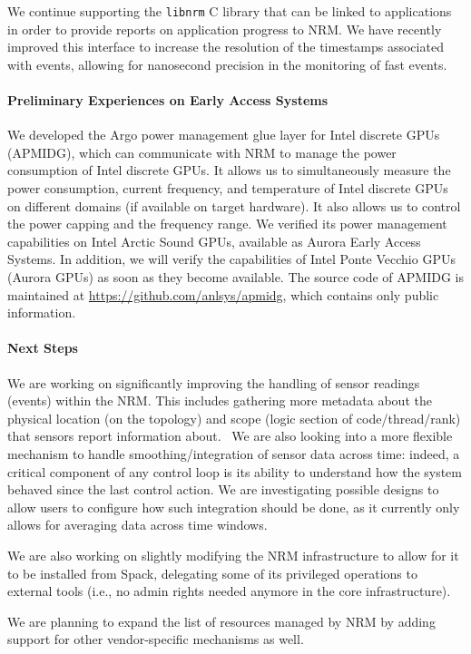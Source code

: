 We continue supporting the \texttt{libnrm} C library that can be linked to
applications in order to provide reports on application progress to NRM. We
have recently improved this interface to increase the resolution of the
timestamps associated with events, allowing for nanosecond precision in the
monitoring of fast events.

\paragraph{Preliminary Experiences on Early Access Systems}

We developed the Argo power management glue layer for Intel discrete GPUs
(APMIDG), which can communicate with NRM to manage the power consumption of
Intel discrete GPUs. It allows us to simultaneously measure the power
consumption, current frequency, and temperature of Intel discrete GPUs on
different domains (if available on target hardware). It also allows us to
control the power capping and the frequency range. We verified its power
management capabilities on Intel Arctic Sound GPUs, available as Aurora
Early Access Systems. In addition, we will verify the capabilities of Intel
Ponte Vecchio GPUs (Aurora GPUs) as soon as they become available. The
source code of APMIDG is maintained at \url{https://github.com/anlsys/apmidg},
which contains only public information.

\paragraph{Next Steps}

We are working on significantly improving the handling of sensor readings
(events) within the NRM. This includes gathering more metadata about the
physical location (on the topology) and scope (logic section of
code/thread/rank) that sensors report information about.  We are also
looking into a more flexible mechanism to handle smoothing/integration of
sensor data across time: indeed, a critical component of any control loop
is its ability to understand how the system behaved since the last control
action. We are investigating possible designs to allow users to configure
how such integration should be done, as it currently only allows for
averaging data across time windows.

We are also working on slightly modifying the NRM infrastructure to allow
for it to be installed from Spack, delegating some of its privileged
operations to external tools (i.e., no admin rights needed anymore in the
core infrastructure).

We are planning to expand the list of resources managed by NRM by adding
support for other vendor-specific mechanisms as well.

